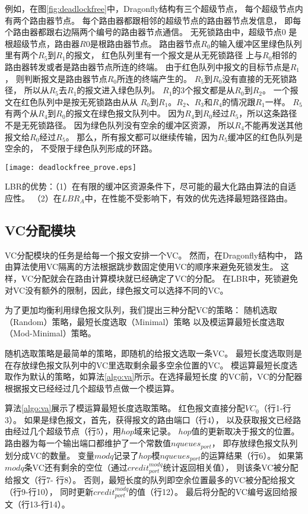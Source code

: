 例如，在图\ref{fig:deadlockfree}中，Dragonfly结构有三个超级节点，
每个超级节点内有两个路由器节点。
每个路由器都跟相邻的超级节点的路由器节点发信息，
即每个路由器都跟右边隔两个编号的路由器节点通信。
无死锁路由中，超级节点$0$ 是根超级节点，路由器$R0$是根路由器节点。
路由器节点$R_0$的输入缓冲区里绿色队列里有两个$R_5$到$R_1$的报文，
红色队列里有一个报文是从无死锁路径
上与$R_0$相邻的路由器转发或者是路由器节点所连的终端。
由于红色队列中报文的目标节点是$R_1$，
则判断报文是路由器节点$R_0$所连的终端产生的。
$R_5$到$R_0$没有直接的无死锁路径，
所以从$R_5$去$R_1$的报文进入绿色队列。
$R_1$的3个报文都是从$R_0$到$R_2$。
一个报文在红色队列中是按无死锁路由从从
$R_0$到$R_1$。$R_2$、$R_3$和$R_4$的情况跟$R_1$一样。
$R_5$有两个从$R_4$到$R_0$的报文在绿色报文队列中。
因为$R_4$到$R_0$经过$R_5$，所以这条路径不是无死锁路径。
因为绿色队列没有空余的缓冲区资源，
所以$R_4$不能再发送其他报文给$R_0$经过$R_5$。
那么，所有报文都可以继续传输，因为$R_5$缓冲区的红色队列是空余的，
不受限于绿色队列形成的环路。

\begin{figure*}[t]
  \centering
  \texttt{[image: deadlockfree\_prove.eps]}
  \caption{Dragonfly的死锁避免机制范例}
  \label{fig:deadlockfree}
\end{figure*}

LBR的优势：（1）在有限的缓冲区资源条件下，尽可能的最大化路由算法的自适应性。
（2）在$LBR_A$中，在性能不受影响下，有效的优先选择最短路径路由。

\subsection{VC分配模块}

VC分配模块的任务是给每一个报文安排一个VC。
然而，在Dragonfly结构中，
路由算法使用VC隔离的方法根据跳步数固定使用VC的顺序来避免死锁发生。
这样，VC分配就会在路由计算模块就已经确定了VC的分配。
在LBR中，死锁避免对VC没有额外的限制，因此，绿色报文可以选择不同的VC。

为了更加均衡利用绿色报文队列，我们提出三种分配VC的策略：
随机选取（Random）策略，最短长度选取（Minimal）策略
以及模运算最短长度选取（Mod-Minimal）策略。

随机选取策略是最简单的策略，即随机的给报文选取一条VC。
最短长度选取则是在存放绿色报文队列中的VC里选取剩余最多空余位置的VC。
模运算最短长度选取作为默认的策略，如算法\ref{algo:va}所示。在选择最短长度
的VC前，VC的分配器根据报文已经经过几个超级节点做一个模运算。

算法\ref{algo:va}展示了模运算最短长度选取策略。
红色报文直接分配$VC_0$（行1-行3）。
如果是绿色报文，首先，获得报文的路由端口（行4），
以及获取报文已经路由经过几个超级节点（行5），用$hop$域来记录。
$hop$值的更新取决于报文的位置。
路由器为每一个输出端口都维护了一个常数值$nqueues_{port}$，
即存放绿色报文队列划分成VC的数量。
变量$modq$记录了$hop$模$nqueues_{port}$的运算结果（行6）。
如果第$modq$条VC还有剩余的空位（通过$credit_{port}^{modq}$统计返回相关值），
则该条VC被分配给报文（行7- 行8）。
否则，最短长度的队列即空余位置最多的VC被分配给报文（行9-行10），
同时更新$credit_{port}^{modq}$的值（行12）。
最后将分配的VC编号返回给报文（行13-行14）。

